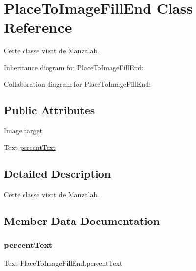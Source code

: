 \hypertarget{class_place_to_image_fill_end}{}\section{Place\+To\+Image\+Fill\+End Class Reference}
\label{class_place_to_image_fill_end}


Cette classe vient de Manzalab.  




Inheritance diagram for Place\+To\+Image\+Fill\+End\+:


Collaboration diagram for Place\+To\+Image\+Fill\+End\+:
\subsection*{Public Attributes}
\begin{DoxyCompactItemize}
\item 
Image \hyperlink{class_place_to_image_fill_end_adcd4e1df6fcc9ef3a7bc94a31d3cd093}{target}
\item 
Text \hyperlink{class_place_to_image_fill_end_a2db54704d784ac0cdcc4d65362e327c2}{percent\+Text}
\end{DoxyCompactItemize}


\subsection{Detailed Description}
Cette classe vient de Manzalab. 



\subsection{Member Data Documentation}
\mbox{\label{class_place_to_image_fill_end_a2db54704d784ac0cdcc4d65362e327c2}} 
\subsubsection{\texorpdfstring{percent\+Text}{percentText}}
{\footnotesize\ttfamily Text Place\+To\+Image\+Fill\+End.\+percent\+Text}

\mbox{\label{class_place_to_image_fill_end_adcd4e1df6fcc9ef3a7bc94a31d3cd093}} 
